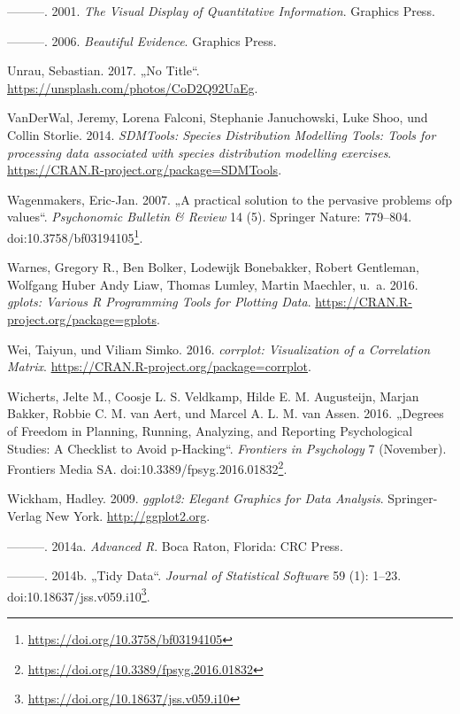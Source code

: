 \documentclass[12pt,ngerman,]{book}
\let\rmarkdownfootnote\footnote%
\def\footnote{\protect\rmarkdownfootnote}
\renewcommand{\href}[2]{#2\footnote{\url{#1}}}
\theoremstyle{definition}
\theoremstyle{definition}
\theoremstyle{remark}
\begin{document}
\hypertarget{ref-1930824130}{}
---------. 2001. \emph{The Visual Display of Quantitative Information}.
Graphics Press.

\hypertarget{ref-1930824165}{}
---------. 2006. \emph{Beautiful Evidence}. Graphics Press.

\hypertarget{ref-unrau1}{}
Unrau, Sebastian. 2017. „No Title``.
\url{https://unsplash.com/photos/CoD2Q92UaEg}.

\hypertarget{ref-R-SDMTools}{}
VanDerWal, Jeremy, Lorena Falconi, Stephanie Januchowski, Luke Shoo, und
Collin Storlie. 2014. \emph{SDMTools: Species Distribution Modelling
Tools: Tools for processing data associated with species distribution
modelling exercises}. \url{https://CRAN.R-project.org/package=SDMTools}.

\hypertarget{ref-Wagenmakers2007}{}
Wagenmakers, Eric-Jan. 2007. „A practical solution to the pervasive
problems ofp values``. \emph{Psychonomic Bulletin \& Review} 14 (5).
Springer Nature: 779--804.
doi:\href{https://doi.org/10.3758/bf03194105}{10.3758/bf03194105}.

\hypertarget{ref-R-gplots}{}
Warnes, Gregory R., Ben Bolker, Lodewijk Bonebakker, Robert Gentleman,
Wolfgang Huber Andy Liaw, Thomas Lumley, Martin Maechler, u.~a. 2016.
\emph{gplots: Various R Programming Tools for Plotting Data}.
\url{https://CRAN.R-project.org/package=gplots}.

\hypertarget{ref-R-corrplot}{}
Wei, Taiyun, und Viliam Simko. 2016. \emph{corrplot: Visualization of a
Correlation Matrix}. \url{https://CRAN.R-project.org/package=corrplot}.

\hypertarget{ref-Wicherts2016}{}
Wicherts, Jelte M., Coosje L. S. Veldkamp, Hilde E. M. Augusteijn,
Marjan Bakker, Robbie C. M. van Aert, und Marcel A. L. M. van Assen.
2016. „Degrees of Freedom in Planning, Running, Analyzing, and Reporting
Psychological Studies: A Checklist to Avoid p-Hacking``. \emph{Frontiers
in Psychology} 7 (November). Frontiers Media SA.
doi:\href{https://doi.org/10.3389/fpsyg.2016.01832}{10.3389/fpsyg.2016.01832}.

\hypertarget{ref-R-ggplot2}{}
Wickham, Hadley. 2009. \emph{ggplot2: Elegant Graphics for Data
Analysis}. Springer-Verlag New York. \url{http://ggplot2.org}.

\hypertarget{ref-wickham2014advanced}{}
---------. 2014a. \emph{Advanced R}. Boca Raton, Florida: CRC Press.

\hypertarget{ref-tidydata}{}
---------. 2014b. „Tidy Data``. \emph{Journal of Statistical Software}
59 (1): 1--23.
doi:\href{https://doi.org/10.18637/jss.v059.i10}{10.18637/jss.v059.i10}.
\end{document}
